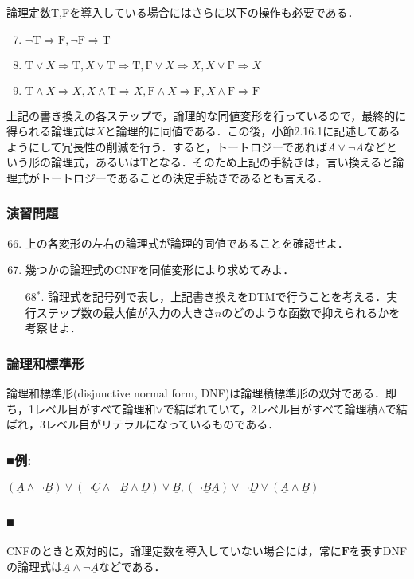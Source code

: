 \documentclass{ltjsarticle}
\theoremstyle{mystyle1}
\theoremstyle{mystyle3}
\theoremstyle{mystyle2}
\newcommand{\uA}{\underline{A}}
\newcommand{\uB}{\underline{B}}
\newcommand{\uC}{\underline{C}}
\newcommand{\uD}{\underline{D}}
\newcommand{\bF}{\ensuremath{\mathbf{F}}}
\newcommand{\rT}{\ensuremath{\mathrm{T}}}
\newcommand{\rF}{\ensuremath{\mathrm{F}}}
\newcommand{\red}[1]{{\color{red} #1}}
\begin{document}
論理定数T,Fを導入している場合にはさらに以下の操作も必要である．
\begin{enumerate}
  \setcounter{enumi}{6}
  \item $\neg \rT \Rightarrow \rF, \neg\rF\Rightarrow\rT$
  \item $\rT\vee X\Rightarrow\rT, X\vee\rT\Rightarrow\rT, \rF\vee X\Rightarrow X,X\vee\rF\Rightarrow X$
  \item $\rT\wedge X\Rightarrow X,X\wedge\rT\Rightarrow X, \rF\wedge X\Rightarrow\rF,X\wedge\rF\Rightarrow\rF$
\end{enumerate}
上記の書き換えの各ステップで，論理的な同値変形を行っているので，最終的に得られる論理式は$X$と論理的に同値である．この後，小節2.16.1に記述してあるようにして冗長性の削減を行う．すると，トートロジーであれば$A\vee\neg A$などという形の論理式，あるいはTとなる．そのため上記の手続きは，言い換えると論理式がトートロジーであることの決定手続きであるとも言える．
\subsubsection*{演習問題}
\begin{enumerate}
  \setcounter{enumi}{65}
  \item 上の各変形の左右の論理式が論理的同値であることを確認せよ．
  \item 幾つかの論理式のCNFを同値変形により求めてみよ．
  \item[68$^\ast$.] 論理式を記号列で表し，上記書き換えをDTMで行うことを考える．実行ステップ数の最大値が入力の大きさ$n$のどのような函数で抑えられるかを考察せよ．
\end{enumerate}
\subsubsection{論理和標準形}
\red{論理和標準形}(disjunctive normal form, DNF)は論理積標準形の双対である．即ち，1レベル目がすべて論理和$\vee$で結ばれていて，2レベル目がすべて論理積$\wedge$で結ばれ，3レベル目がリテラルになっているものである．
\subsubsection*{■例:}
$(\uA\wedge\neg\uB)\vee(\neg\uC\wedge\neg\uB\wedge\uD)\vee\uB,(\neg\uB\uA)\vee\neg\uD\vee(\uA\wedge\uB)$
\subsubsection*{■}
CNFのときと双対的に，論理定数を導入していない場合には，常に$\bF$を表すDNFの論理式は$\uA\wedge\neg\uA$などである．
\end{document}
